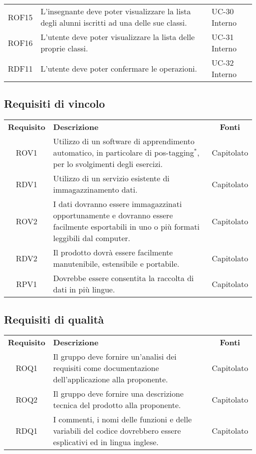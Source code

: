 \begin{tabularx}{\textwidth}{| c | p{10cm} | X |}
		ROF15 & L'insegnante deve poter visualizzare la lista degli alunni iscritti ad una delle sue classi. & UC-30 \newline Interno\\
		ROF16 & L'utente deve poter visualizzare la lista delle proprie classi. & UC-31 \newline Interno\\
		RDF11 & L'utente deve poter confermare le operazioni. & UC-32 \newline Interno\\
		\hline
\end{tabularx}

\subsection{Requisiti di vincolo}
\begin{longtable}{| c | p{10cm} | c |}
		\rowcolor{LightBlue}
		\color{white}\bfseries Requisito & \color{white}\bfseries Descrizione & \color{white}\bfseries Fonti\\[0.25cm]
		ROV1 & Utilizzo di un software di apprendimento automatico, in particolare di pos-tagging$^*$, per lo svolgimenti degli esercizi. & Capitolato \\
		RDV1 & Utilizzo di un servizio esistente di immagazzinamento dati. & Capitolato \\
		ROV2 & I dati dovranno essere immagazzinati opportunamente e dovranno essere facilmente esportabili in uno o più formati leggibili dal computer. & Capitolato \\
		RDV2 & Il prodotto dovrà essere facilmente manutenibile, estensibile e portabile. & Capitolato \\
		RPV1 & Dovrebbe essere consentita la raccolta di dati in più lingue. & Capitolato \\ \hline
\end{longtable}

\subsection{Requisiti di qualità}
\begin{longtable}{| c | p{10cm} | c |}
		\rowcolor{LightBlue}
		\color{white}\bfseries Requisito & \color{white}\bfseries Descrizione & \color{white}\bfseries Fonti\\[0.25cm]
		ROQ1 & Il gruppo deve fornire un'analisi dei requisiti come documentazione dell'applicazione alla proponente. & Capitolato \\
		ROQ2 & Il gruppo deve fornire una descrizione tecnica del prodotto alla proponente. & Capitolato \\ 
		RDQ1 & I commenti, i nomi delle funzioni e delle variabili del codice dovrebbero essere esplicativi ed in lingua inglese. & Capitolato \\ \hline
\end{longtable}